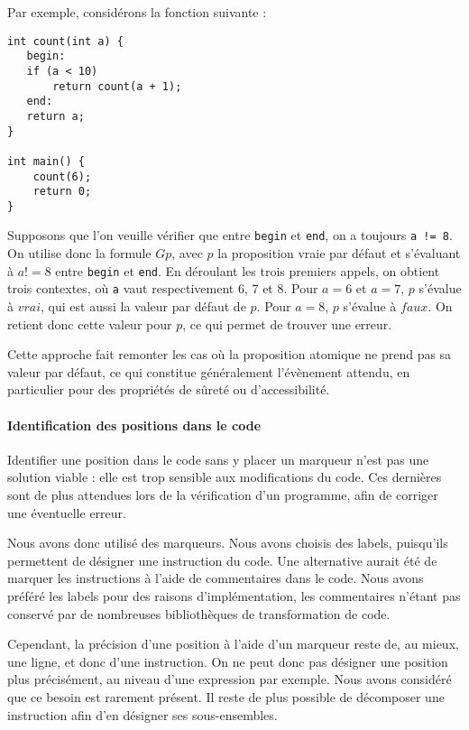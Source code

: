 Par exemple, considérons la fonction suivante :

\begin{lstlisting}
int count(int a) {
   begin:
   if (a < 10)
       return count(a + 1);
   end:
   return a;
}

int main() {
    count(6);
    return 0;
}
\end{lstlisting}

Supposons que l'on veuille vérifier que entre \lstinline!begin! et
\lstinline!end!, on a toujours \lstinline"a != 8". On utilise donc la
formule \(G p\), avec \(p\) la proposition vraie par défaut et
s'évaluant à \(a != 8\) entre \lstinline!begin! et \lstinline!end!. En
déroulant les trois premiers appels, on obtient trois contextes, où
\lstinline!a! vaut respectivement 6, 7 et 8. Pour \(a = 6\) et
\(a = 7\), \(p\) s'évalue à \(vrai\), qui est aussi la valeur par défaut
de \(p\). Pour \(a = 8\), \(p\) s'évalue à \(faux\). On retient donc
cette valeur pour \(p\), ce qui permet de trouver une erreur.

Cette approche fait remonter les cas où la proposition atomique ne prend
pas sa valeur par défaut, ce qui constitue généralement l'évènement
attendu, en particulier pour des propriétés de sûreté ou
d'accessibilité.

\paragraph{Identification des positions dans le code}

Identifier une position dans le code sans y placer un marqueur n'est pas
une solution viable : elle est trop sensible aux modifications du code.
Ces dernières sont de plus attendues lors de la vérification d'un
programme, afin de corriger une éventuelle erreur.

Nous avons donc utilisé des marqueurs. Nous avons choisis des labels,
puisqu'ils permettent de désigner une instruction du code. Une
alternative aurait été de marquer les instructions à l'aide de
commentaires dans le code. Nous avons préféré les labels pour des
raisons d'implémentation, les commentaires n'étant pas conservé par de
nombreuses bibliothèques de transformation de code.

Cependant, la précision d'une position à l'aide d'un marqueur reste de,
au mieux, une ligne, et donc d'une instruction. On ne peut donc pas
désigner une position plus précisément, au niveau d'une expression par
exemple. Nous avons considéré que ce besoin est rarement présent. Il
reste de plus possible de décomposer une instruction afin d'en désigner
ses sous-ensembles.


